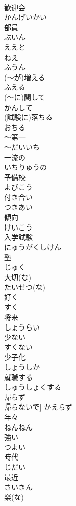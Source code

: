 \documentclass[8pt]{extreport}
\begin{document}
\begin{CJK}{UTF8}{min}
\\	歓迎会	
\\	かんげいかい
\\	部員	
\\	ぶいん
\\	ええと	
\\	ねえ	
\\	ふうん	
\\	(～が)増える	
\\	ふえる
\\	(～に)関して	
\\	かんして
\\	(試験に)落ちる	
\\	おちる
\\	～第一	
\\	～だいいち
\\	一流の	
\\	いちりゅうの
\\	予備校	
\\	よびこう
\\	付き合い	
\\	つきあい
\\	傾向	
\\	けいこう
\\	入学試験	
\\	にゅうがくしけん
\\	塾	
\\	じゅく
\\	大切(な)	
\\	たいせつ(な)
\\	好く	
\\	すく
\\	将来	
\\	しょうらい
\\	少ない	
\\	すくない
\\	少子化	
\\	しょうしか
\\	就職する	
\\	しゅうしょくする
\\	帰らず	
\\	帰らないで]	かえらず
\\	年々	
\\	ねんねん
\\	強い	
\\	つよい
\\	時代	
\\	じだい
\\	最近	
\\	さいきん
\\	楽(な)	

\end{CJK}
\end{document}
